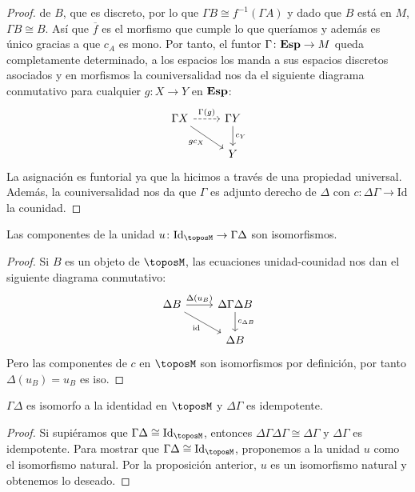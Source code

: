 \begin{proof}
  de $B$, que es discreto, por lo que $\Gamma B \cong f^{-1} (\Gamma A)$ y dado que $B$ está
  en $M$, $\Gamma B \cong B$. Así que $\overline{f}$ es el morfismo que cumple lo que queríamos
  y además es único gracias a que $c_A$ es mono. Por tanto, el funtor $\Gamma\colon \mathbf{Esp} \to M$ queda
  completamente determinado, a los espacios los manda a sus espacios discretos asociados
  y en morfismos la couniversalidad nos da el siguiente diagrama conmutativo para cualquier $g\colon X\to Y$ en $\mathbf{Esp}$:
  \begin{equation*}
    \begin{tikzcd}
      \Gamma X\ar[swap]{rd}{gc_X}\ar[dashed]{r}{\Gamma(g)} & \Gamma Y\ar{d}{c_Y} \\
      & Y
    \end{tikzcd}
  \end{equation*}
  La asignación es funtorial ya que la hicimos a través de una propiedad universal. Además,
  la couniversalidad nos da que $\Gamma$ es adjunto derecho de $\Delta$ con $c\colon \Delta\Gamma \to \text{Id}$ la counidad.
\end{proof}

\begin{proposition}
  Las componentes de la unidad $u\colon \text{Id}_{\toposM} \to \Gamma\Delta$ son isomorfismos.
\end{proposition}
\begin{proof}
  Si $B$ es un objeto de $\toposM$, las ecuaciones unidad-counidad nos dan el siguiente diagrama conmutativo:
  \begin{equation*}
    \begin{tikzcd}
      \Delta B\ar[swap]{rd}{\text{id}}\ar{r}{\Delta(u_B)} & \Delta\Gamma\Delta B\ar{d}{c_{\Delta B}} \\
      & \Delta B
    \end{tikzcd}
  \end{equation*}
  Pero las componentes de $c$ en $\toposM$ son isomorfismos por definición, por tanto 
  $\Delta(u_B)=u_B$ es iso.
\end{proof}

\begin{corollary}[label=cor:unidadidentidad]
  $\Gamma\Delta$ es isomorfo a la identidad en $\toposM$ y $\Delta\Gamma$ es idempotente.
\end{corollary}
\begin{proof}
  Si supiéramos que $\Gamma\Delta\cong\Id_{\toposM}$, entonces $\Delta\Gamma\Delta\Gamma \cong \Delta\Gamma$
  y $\Delta\Gamma$ es idempotente. Para mostrar que $\Gamma\Delta\cong\Id_{\toposM}$, proponemos a la unidad $u$
  como el isomorfismo natural. Por la proposición anterior, $u$ es un isomorfismo natural y obtenemos lo deseado.
\end{proof}


